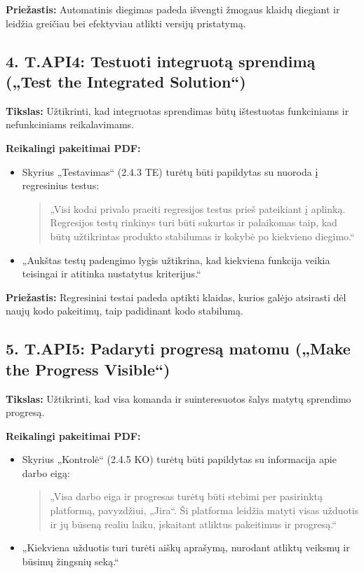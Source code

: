 \documentclass{article}
\begin{document}
\textbf{Priežastis:} Automatinis diegimas padeda išvengti žmogaus klaidų diegiant ir leidžia greičiau bei efektyviau atlikti versijų pristatymą.

\subsection*{4. T.API4: Testuoti integruotą sprendimą („Test the Integrated Solution“) }

\textbf{Tikslas:} Užtikrinti, kad integruotas sprendimas būtų ištestuotas funkciniams ir nefunkciniams reikalavimams.

\textbf{Reikalingi pakeitimai PDF:}
\begin{itemize}
    \item Skyrius „Testavimas“ (2.4.3 TE) turėtų būti papildytas su nuoroda į regresinius testus:
    \begin{quote}
    „Visi kodai privalo praeiti regresijos testus prieš pateikiant į aplinką. Regresijos testų rinkinys turi būti sukurtas ir palaikomas taip, kad būtų užtikrintas produkto stabilumas ir kokybė po kiekvieno diegimo.“
    \end{quote}
    \item „Aukštas testų padengimo lygis užtikrina, kad kiekviena funkcija veikia teisingai ir atitinka nustatytus kriterijus.“
\end{itemize}

\textbf{Priežastis:} Regresiniai testai padeda aptikti klaidas, kurios galėjo atsirasti dėl naujų kodo pakeitimų, taip padidinant kodo stabilumą.

\subsection*{5. T.API5: Padaryti progresą matomu („Make the Progress Visible“) }

\textbf{Tikslas:} Užtikrinti, kad visa komanda ir suinteresuotos šalys matytų sprendimo progresą.

\textbf{Reikalingi pakeitimai PDF:}
\begin{itemize}
    \item Skyrius „Kontrolė“ (2.4.5 KO) turėtų būti papildytas su informacija apie darbo eigą:
    \begin{quote}
    „Visa darbo eiga ir progresas turėtų būti stebimi per pasirinktą platformą, pavyzdžiui, „Jira“. Ši platforma leidžia matyti visas užduotis ir jų būseną realiu laiku, įskaitant atliktus pakeitimus ir progresą.“
    \end{quote}
    \item „Kiekviena užduotis turi turėti aiškų aprašymą, nurodant atliktų veiksmų ir būsimų žingsnių seką.“
\end{itemize}
\end{document}
